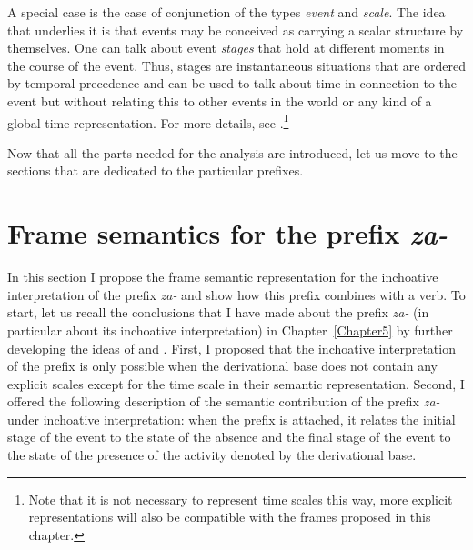 A special case is the case of conjunction  of the types \textit{event} and \textit{scale}. The idea that underlies it is that events may be conceived as carrying a scalar structure by themselves. One can talk about event \emph{stages} that hold at different moments in the course of the event. Thus, stages are instantaneous situations that are ordered by temporal precedence and can be used to talk about time in connection to the event but without relating this to other events in the world or any kind of a global time representation. For more details, see \citet{ZinovaOsswald:paper}.\footnote{Note that it is not necessary to represent time scales this way, more explicit representations will also be compatible with the frames proposed in this chapter.}

Now that all the parts needed for the analysis are introduced, let us move to the sections that are dedicated to the particular prefixes.

\section{Frame semantics for the prefix \textit{za-}  }\label{section:frame:za}
In this section I propose the frame semantic representation for the inchoative  interpretation of the prefix \textit{za-}   and show how this prefix combines with a verb. To start, let us recall the conclusions that I have made about the prefix \textit{za-}   (in particular about its inchoative  interpretation) in Chapter~\ref{Chapter5} by further developing the ideas of \citet{Braginsky:08} and \citet{Kagan:book}. First, I proposed that the inchoative  interpretation of the prefix is only possible when the derivational base does not contain any explicit scales except for the time scale in their semantic representation. Second, I offered the following description of the semantic contribution of the prefix \textit{za-}   under inchoative  interpretation: when the prefix is attached, it relates the initial stage of the event to the state of the absence and the final stage of the event to the state of the presence of the activity denoted by the derivational base.

